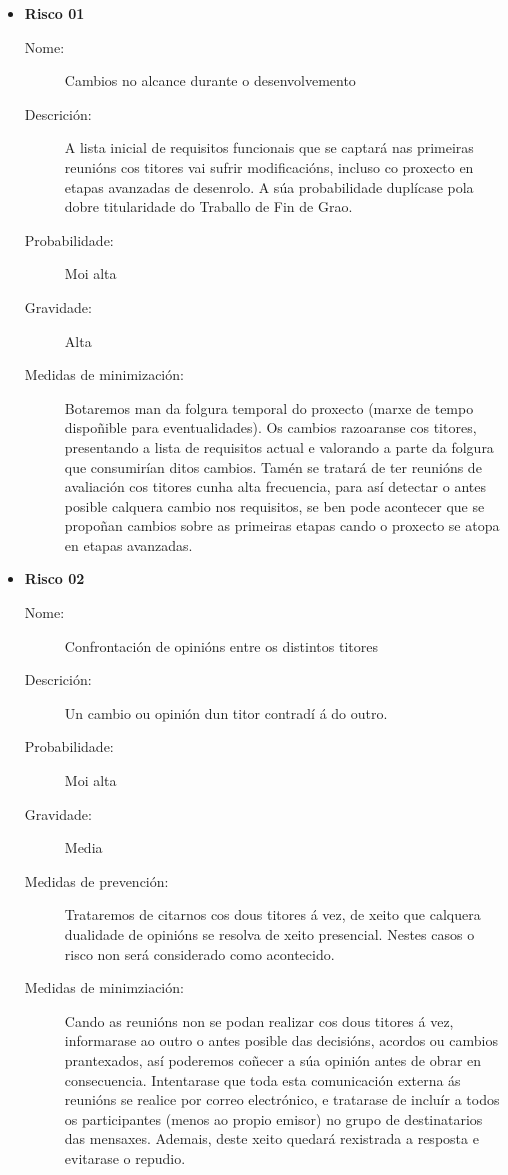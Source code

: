 \begin{itemize}

\item \textbf{Risco 01}
\begin{description}
\item[Nome:] Cambios no alcance durante o desenvolvemento
\item[Descrición:] A lista inicial de requisitos funcionais que se captará nas primeiras reunións cos titores vai sufrir modificacións, incluso co proxecto en etapas avanzadas de desenrolo. A súa probabilidade duplícase pola dobre titularidade do Traballo de Fin de Grao.
\item[Probabilidade:] Moi alta
\item[Gravidade:] Alta
\item[Medidas de minimización:] Botaremos man da folgura temporal do proxecto (marxe de tempo dispoñible para eventualidades). Os cambios razoaranse cos titores, presentando a lista de requisitos actual e valorando a parte da folgura que consumirían ditos cambios. Tamén se tratará de ter reunións de avaliación cos titores cunha alta frecuencia, para así detectar o antes posible calquera cambio nos requisitos, se ben pode acontecer que se propoñan cambios sobre as primeiras etapas cando o proxecto se atopa en etapas avanzadas.
\end{description}

\item \textbf{Risco 02}
\begin{description}
\item[Nome:] Confrontación de opinións entre os distintos titores
\item[Descrición:] Un cambio ou opinión dun titor contradí á do outro.
\item[Probabilidade:] Moi alta
\item[Gravidade:] Media
\item[Medidas de prevención:] Trataremos de citarnos cos dous titores á vez, de xeito que calquera dualidade de opinións se resolva de xeito presencial. Nestes casos o risco non será considerado como acontecido.
\item[Medidas de minimziación:] Cando as reunións non se podan realizar cos dous titores á vez, informarase ao outro o antes posible das decisións, acordos ou cambios prantexados, así poderemos coñecer a súa opinión antes de obrar en consecuencia. Intentarase que toda esta comunicación externa ás reunións se realice por correo electrónico, e tratarase de incluír a todos os participantes (menos ao propio emisor) no grupo de destinatarios das mensaxes. Ademais, deste xeito quedará rexistrada a resposta e evitarase o repudio.
\end{description}


\end{itemize}

